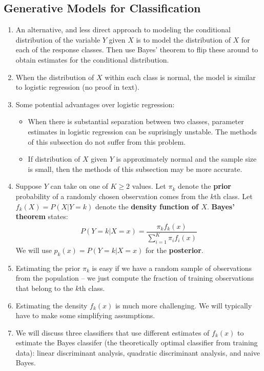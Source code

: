 \documentclass[10pt]{article}
\begin{document}
\subsection{Generative Models for Classification} 
\begin{enumerate}
	\item An alternative, and less direct approach to modeling the conditional distribution of the variable $Y$ given $X$ is to model the distribution of $X$ for each of the response classes.  Then use Bayes' theorem to flip these around to obtain estimates for the conditional distribution. 
	\item When the distribution of $X$ within each class is normal, the model is similar to logistic regression (no proof in text). 
	\item Some potential advantages over logistic regression: \begin{itemize}
		\item When there is substantial separation between two classes, parameter estimates in logistic regression can be suprisingly unstable.  The methods of this subsection do not suffer from this problem.
		\item If distribution of $X$ given $Y$ is approximately normal and the sample size is small, then the methods of this subsection may be more accurate.
	\end{itemize}
	\item Suppose $Y$ can take on one of $K\geq 2$ values.  Let $\pi_k$ denote the \textbf{prior} probability of a randomly chosen observation comes from the $k$th class.  Let $f_k(X) = P(X | Y = k)$ denote the \textbf{density function of $X$}.  \textbf{Bayes' theorem} states: 
	\begin{align*}
		P(Y = k | X = x) = \dfrac{\pi_k f_k(x)}{\sum_{i = 1}^K \pi_i f_i(x)} 
	\end{align*}
	We will use $p_k(x) = P(Y = k | X = x)$ for the \textbf{posterior}. 
	\item Estimating the prior $\pi_k$ is easy if we have a random sample of observations from the population -- we just compute the fraction of training observations that belong to the $k$th class.  
	\item Estimating the density $f_k(x)$ is much more challenging.  We will typically have to make some simplifying assumptions.  
	\item We will discuss three classifiers that use different estimates of $f_k(x)$ to estimate the Bayes classifer (the theoretically optimal classifier from training data): linear discriminant analysis, quadratic discriminant analysis, and naive Bayes.  
\end{enumerate}
\end{document}
